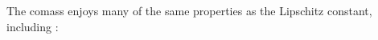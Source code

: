 \documentclass[reqno,11pt]{amsart}
\theoremstyle{definition}
\numberwithin{equation}{section}
\begin{document}



The comass enjoys many of the same properties as the Lipschitz constant, including \cite[Lemma 4.3]{Crandall2008}:
\end{document}
